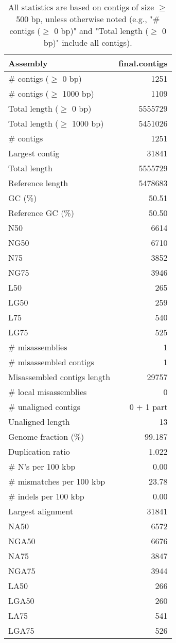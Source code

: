 \documentclass[12pt,a4paper]{article}
\begin{document}
\begin{table}[ht]
\begin{center}
\caption{All statistics are based on contigs of size $\geq$ 500 bp, unless otherwise noted (e.g., "\# contigs ($\geq$ 0 bp)" and "Total length ($\geq$ 0 bp)" include all contigs).}
\begin{tabular}{|l*{1}{|r}|}
\hline
Assembly & final.contigs \\ \hline
\# contigs ($\geq$ 0 bp) & 1251 \\ \hline
\# contigs ($\geq$ 1000 bp) & 1109 \\ \hline
Total length ($\geq$ 0 bp) & 5555729 \\ \hline
Total length ($\geq$ 1000 bp) & 5451026 \\ \hline
\# contigs & 1251 \\ \hline
Largest contig & 31841 \\ \hline
Total length & 5555729 \\ \hline
Reference length & 5478683 \\ \hline
GC (\%) & 50.51 \\ \hline
Reference GC (\%) & 50.50 \\ \hline
N50 & 6614 \\ \hline
NG50 & 6710 \\ \hline
N75 & 3852 \\ \hline
NG75 & 3946 \\ \hline
L50 & 265 \\ \hline
LG50 & 259 \\ \hline
L75 & 540 \\ \hline
LG75 & 525 \\ \hline
\# misassemblies & 1 \\ \hline
\# misassembled contigs & 1 \\ \hline
Misassembled contigs length & 29757 \\ \hline
\# local misassemblies & 0 \\ \hline
\# unaligned contigs & 0 + 1 part \\ \hline
Unaligned length & 13 \\ \hline
Genome fraction (\%) & 99.187 \\ \hline
Duplication ratio & 1.022 \\ \hline
\# N's per 100 kbp & 0.00 \\ \hline
\# mismatches per 100 kbp & 23.78 \\ \hline
\# indels per 100 kbp & 0.00 \\ \hline
Largest alignment & 31841 \\ \hline
NA50 & 6572 \\ \hline
NGA50 & 6676 \\ \hline
NA75 & 3847 \\ \hline
NGA75 & 3944 \\ \hline
LA50 & 266 \\ \hline
LGA50 & 260 \\ \hline
LA75 & 541 \\ \hline
LGA75 & 526 \\ \hline
\end{tabular}
\end{center}
\end{table}
\end{document}
